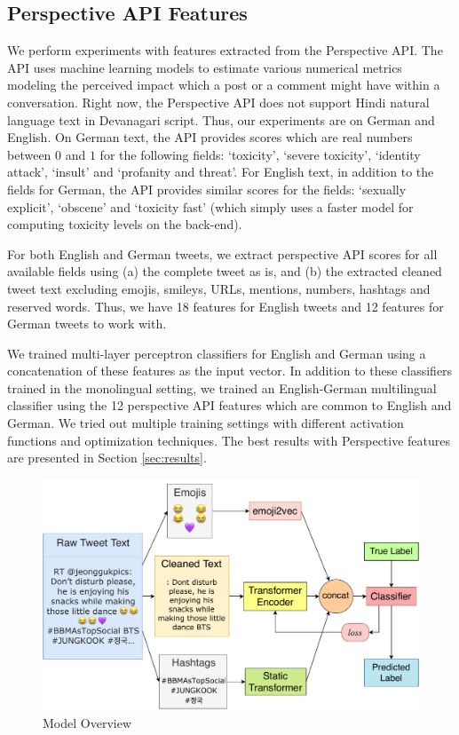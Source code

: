 \documentclass[
]{ceurart}
\begin{document}
\subsection{Perspective API Features}
We perform experiments with features extracted from the Perspective API. The API uses machine learning models to estimate various numerical metrics modeling the perceived impact which a post or a comment might have within a conversation. Right now, the Perspective API does not support Hindi natural language text in Devanagari script. Thus, our experiments are on German and English. On German text, the API provides scores which are real numbers between $0$ and $1$ for the following fields: `toxicity', `severe toxicity', `identity attack', `insult' and `profanity and threat'. For English text, in addition to the fields for German, the API provides similar scores for the fields: `sexually explicit', `obscene' and `toxicity fast' (which simply uses a faster model for computing toxicity levels on the back-end).

For both English and German tweets, we extract perspective API scores for all available fields using (a) the complete tweet as is, and (b) the extracted cleaned tweet text excluding emojis, smileys, URLs, mentions, numbers, hashtags and reserved words. Thus, we have 18 features for English tweets and 12 features for German tweets to work with.

We trained multi-layer perceptron classifiers for English and German using a concatenation of these features as the input vector. In addition to these classifiers trained in the monolingual setting, we trained an English-German multilingual classifier using the 12 perspective API features which are common to English and German. We tried out multiple training settings with different activation functions and optimization techniques. The best results with Perspective features are presented in Section \ref{sec:results}.

\begin{figure}
    \centering
    \includegraphics[scale=0.54]{hate.pdf}
    \caption{Model Overview}
    \label{fig:pipeline}
\end{figure}
\end{document}
